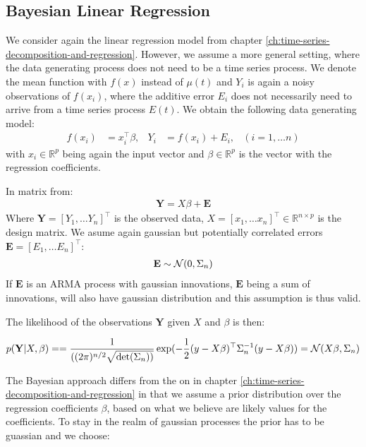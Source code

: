 \subsection{Bayesian Linear Regression}

We consider again the linear regression model from chapter \ref{ch:time-series-decomposition-and-regression}.
However, we assume a more general setting, where the data generating process does not need to be a time series process.
We denote the mean function with $f(x)$ instead of $\mu(t)$ and $Y_i$ is again a noisy observations of
$f(x_i)$, where the additive error $E_i$ does not necessarily need to arrive from a time series process $E(t)$.
We obtain the following data generating model:
\begin{align*}
    f(x_i) &= x_i^{\top}\beta, & Y_i &= f(x_i) + E_i,  & (i = 1, \dots n)
\end{align*}
with $x_i \in \mathbb{R}^p$ being again the input vector and $\beta \in \mathbb{R}^p$ is the vector with
the regression coefficients.

In matrix from:
\begin{align*}
    \mathbf{Y} = X \beta + \mathbf{E}
\end{align*}
Where $\mathbf{Y} = [Y_{1}, \dots Y_{n}]^{\top}$ is the observed data,
$X = [x_{1}, \dots x_{n}]^{\top} \in \mathbb{R}^{n \times p}$ is the design matrix.
We asume again gaussian but potentially correlated errors $\mathbf{E} = [E_{1}, \dots E_{n}]^{\top}$:
\begin{gather*}
    \mathbf{E} \sim \operatorname{\mathcal{N}}(0, \Sigma_n)
\end{gather*}
If $\mathbf{E}$ is an ARMA process with gaussian innovations,
$\mathbf{E}$ being a sum of innovations, will also have gaussian distribution and
this assumption is thus valid.

The likelihood of the observations $\mathbf{Y}$ given $X$ and $\beta$ is then:

\begin{gather*}
    p(\mathbf{Y}|X,\beta) =
    = \frac{1}{( (2\pi)^{n/2} \sqrt {\det(\Sigma_n))}}
    \exp(-\frac{1}{2}(y - X\beta)^{\top} \Sigma_n^{-1}(y-X\beta))
    = \operatorname{\mathcal{N}}(X \beta, \Sigma_n)
\end{gather*}

The Bayesian approach differs from the on in chapter \ref{ch:time-series-decomposition-and-regression} in
that we assume a prior distribution over the regression coefficients $\beta$, based on
what we believe are likely values for the coefficients.
To stay in the realm of gaussian processes the prior has to be guassian and we choose:

